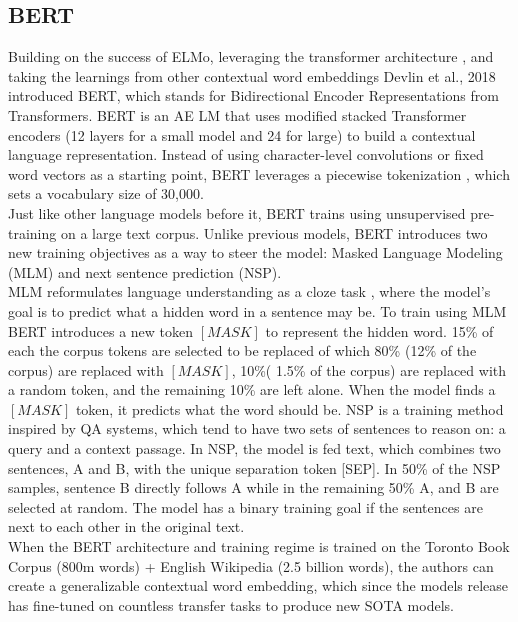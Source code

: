 \subsection{BERT}
\label{Bchap:prior:sec:lm:bert}
Building on the success of ELMo, leveraging the transformer architecture \cite{Vaswani2017AttentionIA}, and taking the learnings from other contextual word embeddings \cite{Howard2018UniversalLM} \cite{Radford2018ImprovingLU} Devlin et al., 2018 introduced BERT, which stands for Bidirectional Encoder Representations from Transformers. BERT is an AE LM that uses modified stacked Transformer encoders (12 layers for a small model and 24 for large) to build a contextual language representation. Instead of using character-level convolutions or fixed word vectors as a starting point, BERT leverages a piecewise tokenization \cite{Wu2016GooglesNM}, which sets a vocabulary size of 30,000.  \\
Just like other language models before it, BERT trains using unsupervised pre-training on a large text corpus. Unlike previous models, BERT introduces two new training objectives as a way to steer the model: Masked Language Modeling (MLM) and next sentence prediction (NSP). \\
MLM reformulates language understanding as a cloze task \cite{Taylor1953ClozePA}, where the model's goal is to predict what a hidden word in a sentence may be. To train using MLM BERT introduces a new token $[MASK]$ to represent the hidden word. 15\% of each the corpus tokens are selected to be replaced of which 80\% (12\% of the corpus) are replaced with $[MASK]$, 10\%( 1.5\% of the corpus) are replaced with a random token, and the remaining 10\% are left alone. When the model finds a $[MASK]$ token, it predicts what the word should be. NSP is a training method inspired by QA systems, which tend to have two sets of sentences to reason on: a query and a context passage. In NSP, the model is fed text, which combines two sentences, A and B, with the unique separation token [SEP]. In 50\% of the NSP samples, sentence B directly follows A while in the remaining 50\% A, and B are selected at random. The model has a binary training goal if the sentences are next to each other in the original text.\\
When the BERT architecture and training regime is trained on the Toronto Book Corpus \cite{Zhu_2015_ICCV} (800m words) + English Wikipedia (2.5 billion words), the authors can create a generalizable contextual word embedding, which since the models release has fine-tuned on countless transfer tasks to produce new SOTA models.
